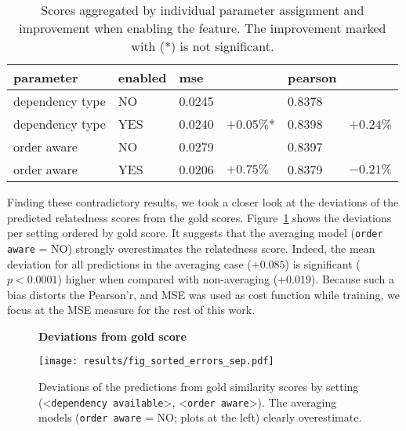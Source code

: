 \begin{table}[htb!]
	\centering
	\begin{tabularx}{\textwidth}{|p{} p{}|X X|X X|} 
		\hline
		parameter & enabled & mse & & pearson  & \\ \hline \hline
		dependency type & NO & 0.0245 & & 0.8378 & \\
		dependency type & YES & 0.0240 & $+0.05\%$* & 0.8398 & $+0.24$\% \\ \hline
		order aware & NO & 0.0279 &  & 0.8397 &  \\
		order aware & YES & 0.0206 & $+0.75\%$ & 0.8379 & $-0.21\%$ \\ \hline	   		
	\end{tabularx}
	\caption{Scores aggregated by individual parameter assignment and improvement when enabling the feature. The improvement marked with (*) is not significant.}
	\label{tab:results_merged}
\end{table}

Finding these contradictory results, we took a closer look at the deviations of the predicted relatedness scores from the gold scores. Figure~\ref{fig:fig_sorted_errors_sep} shows the deviations per setting ordered by gold score. It suggests that the averaging model (\texttt{order aware} = NO) strongly overestimates the relatedness score. Indeed, the mean deviation for all predictions in the averaging case ($+0.085$) is significant ($p < 0.0001$) higher when compared with non-averaging ($+0.019$). Because such a bias distorts the Pearson'r, and \ac{MSE} was used as cost function while training, we focus at the \ac{MSE} measure for the rest of this work.

\begin{figure}[htb!]
	\centering
	\textbf{Deviations from gold score}\par\medskip
	\texttt{[image: results/fig\_sorted\_errors\_sep.pdf]}
	\caption{Deviations of the predictions from gold similarity scores by setting (<\texttt{dependency available}>, <\texttt{order aware}>). The averaging models (\texttt{order aware} = NO; plots at the left) clearly overestimate.}
	\label{fig:fig_sorted_errors_sep}
\end{figure}

